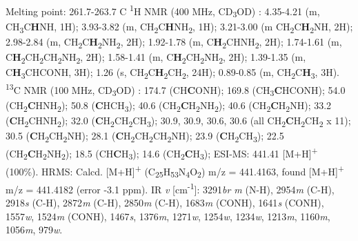 Melting point: 261.7-263.7 \textdegree C
\newline
\textsuperscript{1}H NMR (400 MHz, CD\textsubscript{3}OD) \textdelta:  4.35-4.21 (m, CH\textsubscript{3}C\textbf{H}NH, 1H); 3.93-3.82 (m, CH\textsubscript{2}C\textbf{H}NH\textsubscript{2}, 1H); 3.21-3.00 (m CH\textsubscript{2}C\textbf{H}\textsubscript{2}NH, 2H); 2.98-2.84 (m, CH\textsubscript{2}C\textbf{H}\textsubscript{2}NH\textsubscript{2}, 2H); 1.92-1.78 (m, C\textbf{H}\textsubscript{2}CHNH\textsubscript{2}, 2H); 1.74-1.61 (m, C\textbf{H}\textsubscript{2}CH\textsubscript{2}CH\textsubscript{2}NH\textsubscript{2}, 2H); 1.58-1.41 (m, C\textbf{H}\textsubscript{2}CH\textsubscript{2}NH\textsubscript{2}, 2H); 1.39-1.35 (m, C\textbf{H}\textsubscript{3}CHCONH, 3H);
1.26 (s, CH\textsubscript{2}C\textbf{H}\textsubscript{2}CH\textsubscript{2}, 24H);
0.89-0.85 (m, CH\textsubscript{2}C\textbf{H}\textsubscript{3}, 3H).      
\newline
\textsuperscript{13}C NMR (100 MHz, CD\textsubscript{3}OD) \textdelta: 174.7 (CH\textbf{C}ONH); 169.8 (CH\textsubscript{3}\textbf{C}HCONH); 54.0 (CH\textsubscript{2}\textbf{C}HNH\textsubscript{2}); 50.8 (\textbf{C}HCH\textsubscript{3}); 40.6 (CH\textsubscript{2}\textbf{C}H\textsubscript{2}NH\textsubscript{2}); 40.6 (CH\textsubscript{2}\textbf{C}H\textsubscript{2}NH); 33.2 (\textbf{C}H\textsubscript{2}CHNH\textsubscript{2}); 32.0 (\textbf{C}H\textsubscript{2}CH\textsubscript{2}CH\textsubscript{3}); 30.9, 30.9, 30.6, 30.6 (all CH\textsubscript{2}\textbf{C}H\textsubscript{2}CH\textsubscript{2} x 11); 30.5 (\textbf{C}H\textsubscript{2}CH\textsubscript{2}NH); 28.1 (\textbf{C}H\textsubscript{2}CH\textsubscript{2}CH\textsubscript{2}NH); 23.9 (\textbf{C}H\textsubscript{2}CH\textsubscript{3}); 22.5 (CH\textsubscript{2}\textbf{C}H\textsubscript{2}NH\textsubscript{2}); 18.5 (CH\textbf{C}H\textsubscript{3}); 14.6 (CH\textsubscript{2}\textbf{C}H\textsubscript{3});  
\newline
ESI-MS: 441.41 [M+H]\textsuperscript{+} (100\%).  
\newline
HRMS: Calcd. [M+H]\textsuperscript{+} (C\textsubscript{25}H\textsubscript{53}N\textsubscript{4}O\textsubscript{2}) m/z = 441.4163, found [M+H]\textsuperscript{+} m/z = 441.4182 (error -3.1 ppm).
\newline
IR \textit{v} [cm\textsuperscript{-1}]: 3291\textit{br m} (N-H), 2954\textit{m} (C-H), 2918\textit{s} (C-H), 2872\textit{m} (C-H), 2850\textit{m} (C-H), 1683\textit{m} (CONH), 1641\textit{s} (CONH), 1557\textit{w}, 1524\textit{m} (CONH), 1467\textit{s}, 1376\textit{m}, 1271\textit{w}, 1254\textit{w}, 1234\textit{w}, 1213\textit{m}, 1160\textit{m}, 1056\textit{m}, 979\textit{w}.

